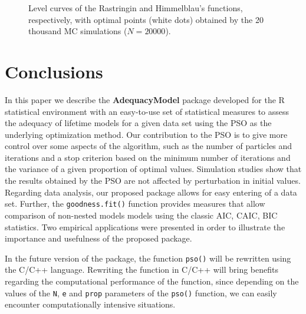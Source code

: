 \documentclass[10pt,letterpaper]{article}
\begin{document}
\begin{figure}[H]
	\centering
	
	\caption{Level curves of the Rastringin and Himmelblau's functions, respectively, with optimal points (white dots) obtained by the 20 thousand MC simulations ($N = 20000$).}
	
\end{figure}


\section{Conclusions}

In this paper we describe the \textbf{AdequacyModel} package developed for the \textsc{R} statistical environment
with an easy-to-use set of statistical measures to assess the adequacy of lifetime models for a given data set using the PSO as the underlying optimization method.
Our contribution to the PSO is to give more control over some aspects of the algorithm,
such as the number of particles and iterations and a stop criterion based on the minimum number of iterations
and the variance of a given proportion of optimal values.
Simulation studies show that the results obtained by the PSO are not affected by perturbation in initial values.
Regarding data analysis, our proposed package allows for easy entering of a data set.
Further, the \texttt{goodness.fit()} function provides measures that allow comparison of non-nested models models using the classic AIC, CAIC, BIC statistics.
Two empirical applications were presented in order to illustrate the importance and usefulness of the proposed package.

In the future version of the package, the function \texttt{pso()} will be rewritten using the \textsc{C}/\textsc{C++} language. Rewriting the function in \textsc{C}/\textsc{C++} will bring benefits regarding the computational performance of the function, since depending on the values of the \texttt{N}, \texttt{e} and \texttt{prop} parameters of the \texttt{pso()} function, we can easily encounter computationally intensive situations.


\end{document}
